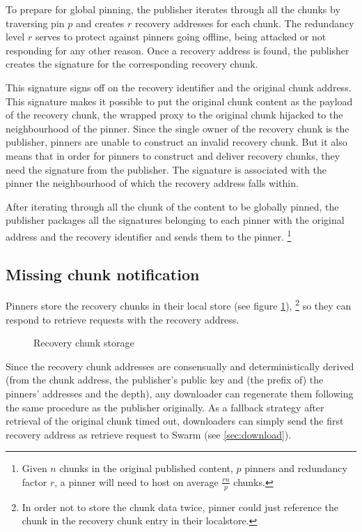 To prepare for global pinning, the publisher iterates through all the chunks by traversing pin $p$ and creates $r$ recovery addresses for each chunk. The redundancy level $r$ serves to protect against pinners going offline, being attacked or not responding for any other reason.
Once a recovery address is found, the publisher creates the signature for the corresponding recovery chunk.

This signature signs off on the recovery identifier and the original chunk address. This signature makes it possible to put the original chunk content as the payload of the recovery chunk, the wrapped proxy to the original chunk hijacked to the neighbourhood of the pinner. Since the single owner of the recovery chunk is the publisher, pinners are unable to construct an invalid recovery chunk.
But it also means that in order for pinners to construct and deliver recovery chunks, they need the signature from the publisher. The signature is associated with the pinner the neighbourhood of which the recovery address falls within.
 
After iterating through all the chunk of the content to be globally pinned, the publisher packages all the signatures belonging to each pinner with the original address and the recovery identifier and sends them to the pinner.%
%
\footnote{Given $n$ chunks in the original published content, $p$ pinners and redundancy factor $r$, a pinner will need to host on average $\frac{rn}{p}$ chunks.}


\subsection{Missing chunk notification}\label{sec:missing-chunk-notifications}

Pinners store the recovery chunks in their local store (see figure \ref{fig:recovery-chunk-storage}), %
\footnote{In order not to store the chunk data twice, pinner could just reference the chunk in the recovery chunk entry in their localstore.}  so they can respond to retrieve requests with the recovery address.

\begin{figure}[htbp]
  \centering
  \caption[Recovery chunk storage]{Recovery chunk storage}
  \label{fig:recovery-chunk-storage}
\end{figure}

Since the recovery chunk addresses are consensually and deterministically derived (from the chunk address, the publisher's public key and (the prefix of) the pinners' addresses and the depth), any downloader can regenerate them following the same procedure as the publisher originally. As a fallback strategy after retrieval of the original chunk timed out, downloaders can simply send the first recovery address as retrieve request to Swarm (see \ref{sec:download}).

